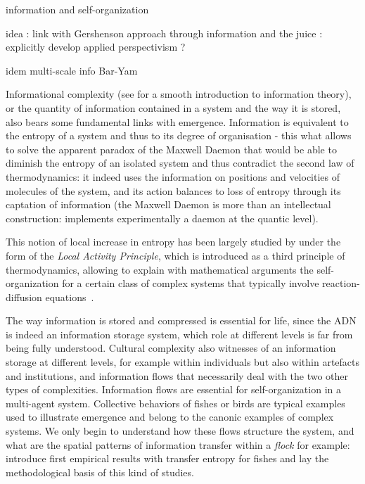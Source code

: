 \cite{e18060197} information and self-organization

idea : link with Gershenson approach through information and the juice : explicitly develop applied perspectivism ?

idem multi-scale info Bar-Yam \cite{allen2017multiscale}


Informational complexity (see \cite{dedeo2016information} for a smooth introduction to information theory), or the quantity of information contained in a system and the way it is stored, also bears some fundamental links with emergence. Information is equivalent to the entropy of a system and thus to its degree of organisation - this what allows to solve the apparent paradox of the Maxwell Daemon that would be able to diminish the entropy of an isolated system and thus contradict the second law of thermodynamics: it indeed uses the information on positions and velocities of molecules of the system, and its action balances to loss of entropy through its captation of information (the Maxwell Daemon is more than an intellectual construction: \cite{cottet2017observing} implements experimentally a daemon at the quantic level).

This notion of local increase in entropy has been largely studied by  under the form of the \emph{Local Activity Principle}, which is introduced as a third principle of thermodynamics, allowing to explain with mathematical arguments the self-organization for a certain class of complex systems that typically involve reaction-diffusion equations~\cite{mainzer2013local}.


The way information is stored and compressed is essential for life, since the ADN is indeed an information storage system, which role at different levels is far from being fully understood. Cultural complexity also witnesses of an information storage at different levels, for example within individuals but also within artefacts and institutions, and information flows that necessarily deal with the two other types of complexities. Information flows are essential for self-organization in a multi-agent system. Collective behaviors of fishes or birds are typical examples used to illustrate emergence and belong to the canonic examples of complex systems. We only begin to understand how these flows structure the system, and what are the spatial patterns of information transfer within a \emph{flock} for example: \cite{crosato2017informative} introduce first empirical results with transfer entropy for fishes and lay the methodological basis of this kind of studies. 

